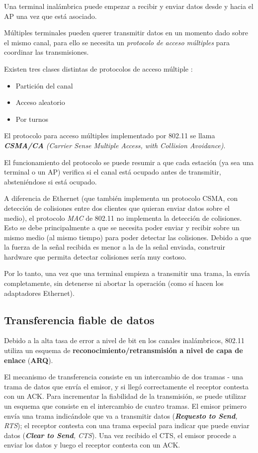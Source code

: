 Una terminal inalámbrica puede empezar a recibir y enviar datos desde y hacia el AP una vez que está asociado.

Múltiples terminales pueden querer transmitir datos en un momento dado sobre el mismo canal, para ello se necesita un \emph{protocolo de acceso múltiples} para coordinar las transmisiones.

Existen tres clases distintas de protocolos de acceso múltiple \autocite{Kurose:Wireless}:

\begin{itemize}
    \item Partición del canal
    \item Acceso aleatorio
    \item Por turnos
\end{itemize}

El protocolo para acceso múltiples implementado por 802.11 se llama \emph{\textbf{CSMA/CA} (Carrier Sense Multiple Access, with Collision Avoidance)}. 

El funcionamiento del protocolo se puede resumir a que cada estación (ya sea una terminal o un AP) verifica si el canal está ocupado antes de transmitir, absteniéndose si está ocupado.

A diferencia de Ethernet (que también implementa un protocolo CSMA, con detección de colisiones entre dos clientes que quieran enviar datos sobre el medio), el protocolo \emph{MAC} de 802.11 no implementa la detección de colisiones. Esto se debe principalmente a que se necesita poder enviar y recibir sobre un mismo medio (al mismo tiempo) para poder detectar las colisiones. Debido a que la fuerza de la señal recibida es menor a la de la señal enviada, construir hardware que permita detectar colisiones sería muy costoso.

Por lo tanto, una vez que una terminal empieza a transmitir una trama, la envía completamente, sin detenerse ni abortar la operación (como sí hacen los adaptadores Ethernet).

\subsection{Transferencia fiable de datos}

Debido a la alta tasa de error a nivel de bit en los canales inalámbricos, 802.11 utiliza un esquema de \textbf{reconocimiento/retransmisión a nivel de capa de enlace} (\textbf{ARQ}).

El mecanismo de transferencia consiste en un intercambio de dos tramas - una trama de datos que envía el emisor, y si llegó correctamente el receptor contesta con un ACK. Para incrementar la fiabilidad de la transmisión, se puede utilizar un esquema que consiste en el intercambio de cuatro tramas. El emisor primero envía una trama indicándole que va a transmitir datos (\emph{\textbf{Requesto to Send}, RTS}); el receptor contesta con una trama especial para indicar que puede enviar datos (\emph{\textbf{Clear to Send}, CTS}). Una vez recibido el CTS, el emisor procede a enviar los datos y luego el receptor contesta con un ACK.

